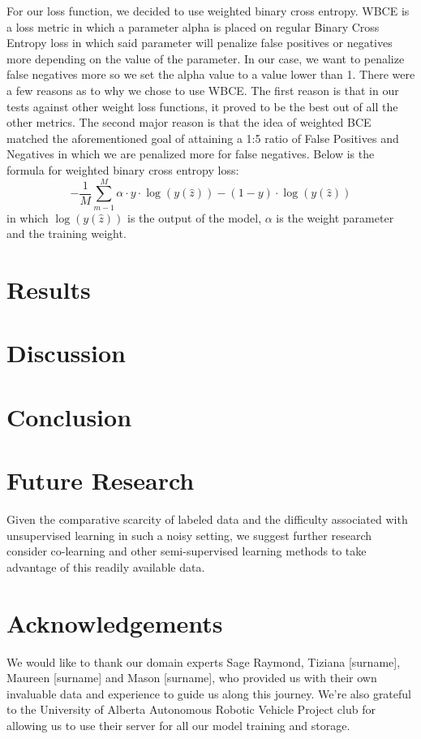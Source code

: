 \documentclass{article}
\begin{document}
For our loss function, we decided to use weighted binary cross entropy. WBCE is a loss metric in which a parameter alpha is placed on  regular Binary Cross Entropy loss in which said parameter will penalize false positives or negatives more depending on the value of the parameter. In our case, we want to penalize false negatives more so we set the alpha value to a value lower than 1. There were a few reasons as to why we chose to use WBCE. The first reason is that in our tests against other weight loss functions, it proved to be the best out of all the other metrics. The second major reason is that the idea of weighted BCE matched the aforementioned goal of attaining a 1:5 ratio of False Positives and Negatives in which we are penalized more for false negatives. Below is the formula for weighted binary cross entropy loss:
\[
-\frac{1}{M}\sum_{m-1}^{M}\alpha \cdot y \cdot \log(y(\hat{z}))-(1-y)\cdot\log(y(\hat{z})) 
\]
in which $\log(y(\hat{z}))$ is the output of the model, $\alpha$ is the weight parameter and the training weight.


\section{Results}

\section{Discussion}

\section{Conclusion}

\section{Future Research}
Given the comparative scarcity of labeled data and the difficulty associated with unsupervised learning in such a noisy setting, we suggest further research consider co-learning and other semi-supervised learning methods to take advantage of this readily available data.

\section{Acknowledgements}
We would like to thank our domain experts Sage Raymond, Tiziana [surname], Maureen [surname] and Mason [surname], who provided us with their own invaluable data and experience to guide us along this journey. We’re also grateful to the University of Alberta Autonomous Robotic Vehicle Project club for allowing us to use their server for all our model training and storage.
\clearpage


\end{document}

